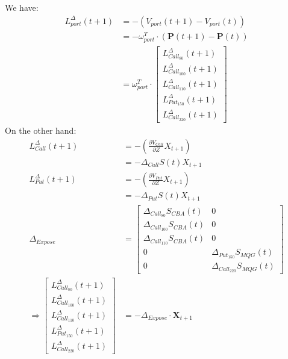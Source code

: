 We have:
\begin{align*}
    L_{port}^\Delta(t+1)&=-(V_{port}(t+1)-V_{port}(t)) \\
    &=-\omega_{port}^T\cdot(\mathbf{P}(t+1)-\mathbf{P}(t))\\
    &=\omega_{port}^T\cdot\begin{bmatrix}L_{Call_{80}}^\Delta(t+1) \\  L_{Call_{100}}^\Delta(t+1)\\ L_{Call_{110}}^\Delta(t+1) \\ L_{Put_{150}}^\Delta(t+1) \\  L_{Call_{220}}^\Delta(t+1)\end{bmatrix}
\end{align*}
On the other hand:
\begin{align*}
    L_{Call}^\Delta(t+1)&=-(\frac{\partial V_{Call}}{\partial Z}X_{t+1}) \\
    &=-\Delta_{Call} S(t) X_{t+1}\\
    L_{Put}^\Delta(t+1)&=-(\frac{\partial V_{Put}}{\partial Z}X_{t+1}) \\
    &=-\Delta_{Put} S(t) X_{t+1}\\
    \Delta_{Expose}&=\begin{bmatrix}
        \Delta_{Call_{80}}S_{CBA}(t) & 0\\
        \Delta_{Call_{100}}S_{CBA}(t) & 0\\
        \Delta_{Call_{110}}S_{CBA}(t) & 0\\
        0 & \Delta_{Put_{150}}S_{MQG}(t)\\
       0 & \Delta_{Call_{220}}S_{MQG}(t)
    \end{bmatrix}\\
    \Longrightarrow \begin{bmatrix}L_{Call_{80}}^\Delta(t+1) \\  L_{Call_{100}}^\Delta(t+1)\\ L_{Call_{110}}^\Delta(t+1) \\ L_{Put_{150}}^\Delta(t+1) \\  L_{Call_{220}}^\Delta(t+1)\end{bmatrix}&=-\Delta_{Expose}\cdot \mathbf{X}_{t+1}
\end{align*}


